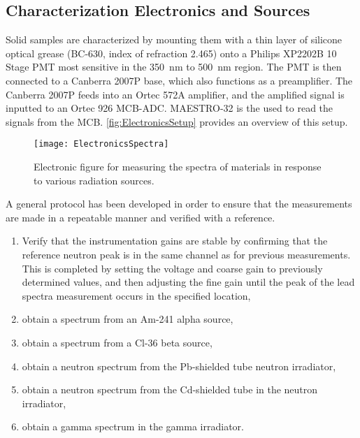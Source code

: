 \subsection{Characterization Electronics and Sources}
Solid samples are characterized by mounting them with a thin layer of silicone optical grease (BC-630, index of refraction 2.465) onto a Philips XP2202B 10 Stage PMT most sensitive in the \SI{350}{\nm} to \SI{500}{\nm} region.
The PMT is then connected to a Canberra 2007P base, which also functions as a preamplifier.
The Canberra 2007P feeds into an Ortec 572A amplifier, and the amplified signal is inputted to an Ortec 926 MCB-ADC.
MAESTRO-32 is the used to read the signals from the MCB.
\autoref{fig:ElectronicsSetup} provides an overview of this setup.
\begin{figure}
  \texttt{[image: ElectronicsSpectra]}
  \caption[Optical Characterization Experiment Setup]{Electronic figure for measuring the spectra of materials in response to various radiation sources.}
  \label{fig:ElectronicsSetup}
\end{figure}
A general protocol has been developed in order to ensure that the measurements are made in a repeatable manner and verified with a reference.
\begin{enumerate}
  \item Verify that the instrumentation gains are stable by confirming that the reference neutron peak is in the same channel as for previous measurements. This is completed by setting the voltage and coarse gain to previously determined values, and then adjusting the fine gain until the peak of the lead spectra measurement occurs in the specified location,
  \item obtain a spectrum from an Am-241 alpha source,
  \item obtain a spectrum from a Cl-36 beta source,
  \item obtain a neutron spectrum from the Pb-shielded tube neutron irradiator,
  \item obtain a neutron spectrum from the Cd-shielded tube in the neutron irradiator,
  \item obtain a gamma spectrum in the gamma irradiator.
\end{enumerate}

